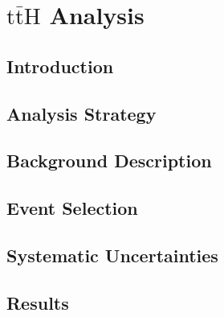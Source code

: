 \chapter{$\mathrm{t\bar{t}H}$ Analysis}

\section{Introduction} \label{sec:tth_intro}

\section{Analysis Strategy} \label{sec:tth_analysis_strategy}

\section{Background Description} \label{sec:tth_background_description}

\section{Event Selection} \label{sec:tth_event_selection}

\section{Systematic Uncertainties} \label{sec:tth_systematic_uncertainties}

\section{Results} \label{sec:tth_results}
